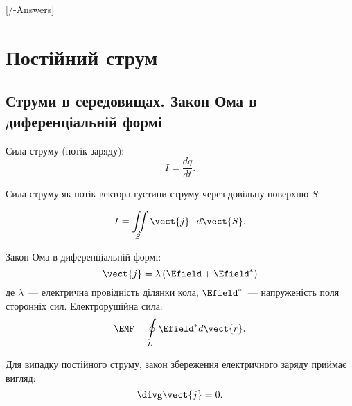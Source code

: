 
[\currfilebase/\currfilebase-Answers]
\chapter{Постійний струм}\label{\currfilebase}

\section{Струми в середовищах. Закон Ома в диференціальній формі}

\begin{Theory}



  Сила струму (потік заряду):
	\begin{equation}
		I = \frac{dq}{dt}.
	\end{equation}

  Сила струму як потік вектора густини струму через довільну поверхню $S$:

  \begin{equation}
	  I = \iint\limits_S\vect{j}\cdot d\vect{S}.
  \end{equation}



	Закон Ома в диференціальній формі:
  \begin{equation}
	  \vect{j} = \lambda\left( \Efield + \Efield^*\right)
  \end{equation}
	\noindent де $\lambda$~--- електрична провідність ділянки кола,  $\Efield^*$~--- напруженість поля сторонніх сил.
	Електрорушійна сила:
	\begin{equation}
	\EMF = \oint\limits_L \Efield^* d\vect{r},
	\end{equation}

Для випадку постійного струму, закон збереження електричного заряду приймає вигляд:
  \begin{equation}
	  \divg\vect{j} = 0.
  \end{equation}

\end{Theory}

